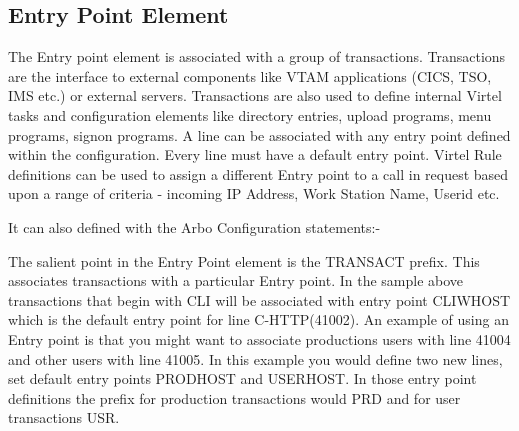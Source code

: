 \documentclass[letterpaper,10pt,english]{sphinxmanual}
\begin{document}
\subsection{Entry Point Element}
\label{\detokenize{connectivity_guide:entry-point-element}}
The Entry point element is associated with a group of transactions. Transactions are the interface to external components like VTAM applications (CICS, TSO, IMS etc.) or external servers. Transactions are also used to define internal Virtel tasks and configuration elements like directory entries, upload programs, menu programs, signon programs. A line can be associated with any entry point defined within the configuration. Every line must have a default entry point. Virtel Rule definitions can be used to assign a different Entry point to a call in request based upon a range of criteria - incoming IP Address, Work Station Name, Userid etc.


It can also defined with the Arbo Configuration statements:-

\begin{sphinxVerbatim}[commandchars=\\\{\}]
                                       
           
                                           
                                           
                                               
                                              
                                        
                                          
                                         
\end{sphinxVerbatim}

The salient point in the Entry Point element is the TRANSACT prefix. This associates transactions with a particular Entry point. In the sample above transactions that begin with CLI will be associated with entry point CLIWHOST which is the default entry point for line C-HTTP(41002). An example of using an Entry point is that you might want to associate productions users with line 41004 and other users with line 41005. In this example you would define two new lines, set default entry points PRODHOST and USERHOST. In those entry point definitions the prefix for production transactions would PRD and for user transactions USR.
\end{document}

